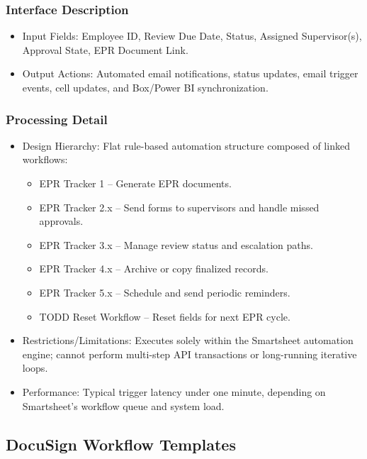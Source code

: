 \documentclass[12pt]{article}
\def\textbf#1{#1}%
\begin{document}
\subsubsection{Interface Description}
\begin{itemize}[nosep]
  \item \textbf{Input Fields:} Employee ID, Review Due Date, Status, Assigned Supervisor(s), Approval State, EPR Document Link.
  \item \textbf{Output Actions:} Automated email notifications, status updates, email trigger events, cell updates, and Box/Power BI synchronization.
\end{itemize}

\subsubsection{Processing Detail}
\begin{itemize}[nosep]
  \item \textbf{Design Hierarchy:} Flat rule-based automation structure composed of linked workflows:
  \begin{itemize}[nosep]
    \item EPR Tracker 1 – Generate EPR documents.
    \item EPR Tracker 2.x – Send forms to supervisors and handle missed approvals.
    \item EPR Tracker 3.x – Manage review status and escalation paths.
    \item EPR Tracker 4.x – Archive or copy finalized records.
    \item EPR Tracker 5.x – Schedule and send periodic reminders.
    \item TODD Reset Workflow – Reset fields for next EPR cycle.
  \end{itemize}
  \item \textbf{Restrictions/Limitations:} 
  Executes solely within the Smartsheet automation engine; cannot perform multi-step API transactions or long-running iterative loops.
  \item \textbf{Performance:}
  Typical trigger latency under one minute, depending on Smartsheet’s workflow queue and system load.
\end{itemize}

\subsection{DocuSign Workflow Templates}
\end{document}
